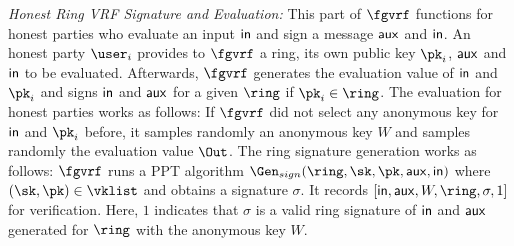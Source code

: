 \smallskip
	\noindent \textit{Honest Ring VRF Signature and Evaluation:} This part of $ \fgvrf $ functions for honest parties who evaluate an input $ \mathsf{in} $ and sign a message $ \mathsf{aux} $ and $ \mathsf{in} $. An honest party $ \user_i $  provides to $ \fgvrf $ a ring, its own public key $ \pk_i $, $ \mathsf{aux} $ and  $ \mathsf{in} $ to be  evaluated. Afterwards, $ \fgvrf $ generates the evaluation value of $ \mathsf{in} $ and $ \pk_i $ and signs $ \mathsf{in} $ and $ \mathsf{aux} $ for a given $ \ring $ if $ \pk_i \in \ring $. The evaluation for honest parties works as follows: If $ \fgvrf $ did not select any anonymous key for $ \mathsf{in} $ and $ \pk_i $ before, it samples randomly an anonymous key $ W $ and samples randomly the evaluation value $ \Out $. The ring signature generation works as follows:  $ \fgvrf $ runs a PPT algorithm $ \Gen_{sign}(\ring, \sk,\pk,\aux,\msg) $ where $ (\sk,\pk) \in \vklist $ and obtains a signature $ \sigma $. It records $  [\msg,\aux, W, \ring,\sigma, 1]  $ for verification. Here, $ 1 $ indicates that $ \sigma  $ is a valid ring signature of $ \mathsf{in} $ and $ \mathsf{aux} $ generated for $ \ring $ with the anonymous key $ W $.


